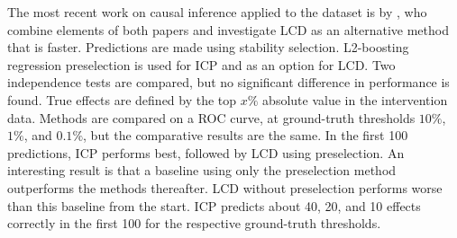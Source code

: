 The most recent work on causal inference applied to the \citet{kemmeren2014large} dataset is by \textbf{\citet{versteeg2019boosting}}, who combine elements of both papers and investigate LCD as an alternative method that is faster. Predictions are made using stability selection. L2-boosting regression preselection is used for ICP and as an option for LCD. Two independence tests are compared, but no significant difference in performance is found. True effects are defined by the top $x\%$ absolute value in the intervention data. Methods are compared on a ROC curve, at ground-truth thresholds $10\%$, $1\%$, and $0.1\%$, but the comparative results are the same. In the first 100 predictions, ICP performs best, followed by LCD using preselection. An interesting result is that a baseline using only the preselection method outperforms the methods thereafter. LCD without preselection performs worse than this baseline from the start. ICP predicts about 40, 20, and 10 effects correctly in the first 100 for the respective ground-truth thresholds.


